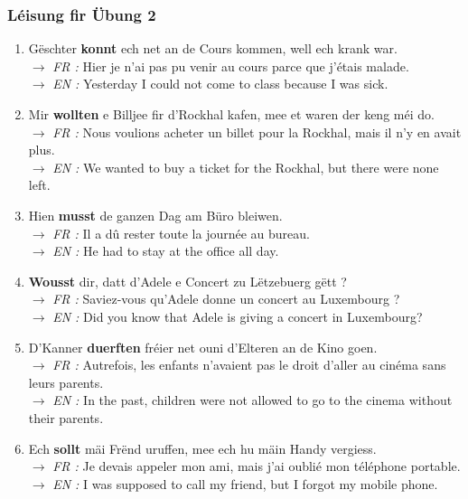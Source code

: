 \subsubsection*{Léisung fir Übung 2}
\begin{enumerate}
    \item Gëschter \textbf{konnt} ech net an de Cours kommen, well ech krank war. \\
    $\rightarrow$ \textit{FR :} Hier je n'ai pas pu venir au cours parce que j'étais malade. \\
    $\rightarrow$ \textit{EN :} Yesterday I could not come to class because I was sick.
    \item Mir \textbf{wollten} e Billjee fir d'Rockhal kafen, mee et waren der keng méi do. \\
    $\rightarrow$ \textit{FR :} Nous voulions acheter un billet pour la Rockhal, mais il n'y en avait plus. \\
    $\rightarrow$ \textit{EN :} We wanted to buy a ticket for the Rockhal, but there were none left.
    \item Hien \textbf{musst} de ganzen Dag am Büro bleiwen. \\
    $\rightarrow$ \textit{FR :} Il a dû rester toute la journée au bureau. \\
    $\rightarrow$ \textit{EN :} He had to stay at the office all day.
    \item \textbf{Wousst} dir, datt d'Adele e Concert zu Lëtzebuerg gëtt ? \\
    $\rightarrow$ \textit{FR :} Saviez-vous qu'Adele donne un concert au Luxembourg ? \\
    $\rightarrow$ \textit{EN :} Did you know that Adele is giving a concert in Luxembourg?
    \item D'Kanner \textbf{duerften} fréier net ouni d'Elteren an de Kino goen. \\
    $\rightarrow$ \textit{FR :} Autrefois, les enfants n'avaient pas le droit d'aller au cinéma sans leurs parents. \\
    $\rightarrow$ \textit{EN :} In the past, children were not allowed to go to the cinema without their parents.
    \item Ech \textbf{sollt} mäi Frënd uruffen, mee ech hu mäin Handy vergiess. \\
    $\rightarrow$ \textit{FR :} Je devais appeler mon ami, mais j'ai oublié mon téléphone portable. \\
    $\rightarrow$ \textit{EN :} I was supposed to call my friend, but I forgot my mobile phone.
\end{enumerate}

